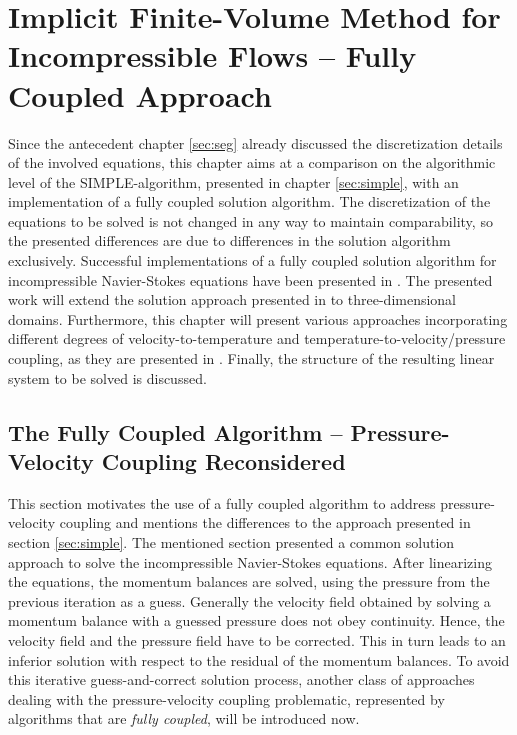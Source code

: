 \chapter{Implicit Finite-Volume Method for Incompressible Flows -- Fully Coupled Approach}
\label{sec:cpld}

Since the antecedent chapter \ref{sec:seg} already discussed the discretization details of the involved equations, this chapter aims at a comparison on the algorithmic level of the SIMPLE-algorithm, presented in chapter \ref{sec:simple}, with an implementation of a fully coupled solution algorithm. The discretization of the equations to be solved is not changed in any way to maintain comparability, so the presented differences are due to differences in the solution algorithm exclusively. Successful implementations of a fully coupled solution algorithm for incompressible Navier-Stokes equations have been presented in \cite{chen10,darwish09,falk13,vakilipour12}. The presented work will extend the solution approach presented in \cite{falk13} to three-dimensional domains. Furthermore, this chapter will present various approaches incorporating different degrees of velocity-to-temperature and temperature-to-velocity/pressure coupling, as they are presented in \cite{vakilipour12}. Finally, the structure of the resulting linear system to be solved is discussed.

\section{The Fully Coupled Algorithm -- Pressure-Velocity Coupling Reconsidered}
\label{sec:reconsider}

This section motivates the use of a fully coupled algorithm to address pressure-velocity coupling and mentions the differences to the approach presented in section \ref{sec:simple}. The mentioned section presented a common solution approach to solve the incompressible Navier-Stokes equations. After linearizing the equations, the momentum balances are solved, using the pressure from the previous iteration as a guess. Generally the velocity field obtained by solving a momentum balance with a guessed pressure does not obey continuity. Hence, the velocity field and the pressure field have to be corrected. This in turn leads to an inferior solution with respect to the residual of the momentum balances. To avoid this iterative guess-and-correct solution process, another class of approaches dealing with the pressure-velocity coupling problematic, represented by algorithms that are \emph{fully coupled}, will be introduced now.

